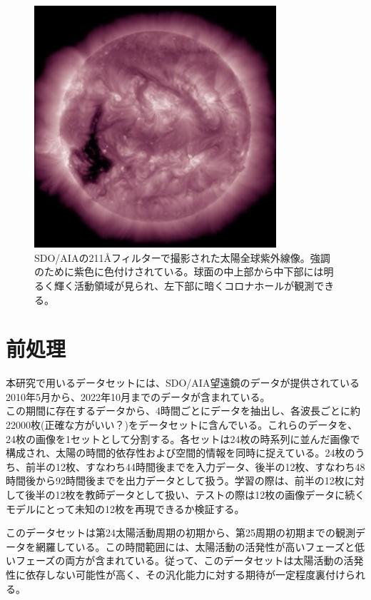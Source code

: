 \begin{figure}[h]
    \centering
    \includegraphics[width=0.8\textwidth]{figures/latest_256_0211.jpg}
    \caption{SDO/AIAの211Åフィルターで撮影された太陽全球紫外線像。強調のために紫色に色付けされている。球面の中上部から中下部には明るく輝く活動領域が見られ、左下部に暗くコロナホールが観測できる。}
    \label{fig:sample_aia211}
\end{figure}
\section{前処理}


本研究で用いるデータセットには、SDO/AIA望遠鏡のデータが提供されている2010年5月から、2022年10月までのデータが含まれている。\\
この期間に存在するデータから、4時間ごとにデータを抽出し、各波長ごとに約22000枚(正確な方がいい？)をデータセットに含んでいる。これらのデータを、24枚の画像を1セットとして分割する。各セットは24枚の時系列に並んだ画像で構成され、太陽の時間的依存性および空間的情報を同時に捉えている。24枚のうち、前半の12枚、すなわち44時間後までを入力データ、後半の12枚、すなわち48時間後から92時間後までを出力データとして扱う。学習の際は、前半の12枚に対して後半の12枚を教師データとして扱い、テストの際は12枚の画像データに続くモデルにとって未知の12枚を再現できるか検証する。


このデータセットは第24太陽活動周期の初期から、第25周期の初期までの観測データを網羅している。この時間範囲には、太陽活動の活発性が高いフェーズと低いフェーズの両方が含まれている。従って、このデータセットは太陽活動の活発性に依存しない可能性が高く、その汎化能力に対する期待が一定程度裏付けられる。



